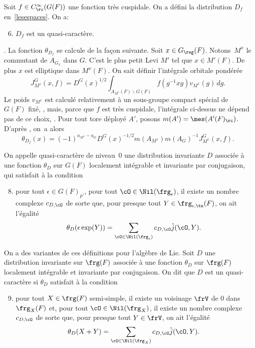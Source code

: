 Soit $f\in C_{\rc}^{\infty}(G(F))$ une fonction très cuspidale. On a défini la distribution $D_{f}$ en~\ref{lesespaces}. On a:
\begin{enumerate}\setcounter{enumi}{5}
\item\label{quasicaracteres6}
$D_{f}$ est un quasi-caractère.
\end{enumerate}
\Cf \cite[5.9]{W1}. La fonction $\theta_{D_{f}}$ se calcule de la façon suivante. Soit $x\in G_{\reg}(F)$. Notons~$M^x$ le commutant de $A_{G_{x}}$ dans $G$. C'est le plus petit Levi $M'$ tel que $x\in M'(F)$. De plus $x$ est elliptique dans $M^{x}(F)$. On sait définir l'intégrale orbitale pondérée
\[
J^G_{M^{x}}(x,f)=D^G(x)^{1/2}\int_{A_{M^{x}}(F)\backslash G(F)}f(g^{-1}xg)v_{M^{x}}(g)\,dg.
\]
Le poids $v_{M^{x}}$ est calculé relativement à un sous-groupe compact spécial de $G(F)$ fixé, \cf \cite{A1}, mais, parce que $f$ est très cuspidale, l'intégrale ci-dessus ne dépend pas de ce choix, \cf \cite[Lem.\,5.2]{W1}. Pour tout tore déployé $A'$, posons $m(A')=\mes(A'(F)_{\rc})$. D'après \cite[9(1)]{W2}, on~a alors
\begin{equation}\tag{7}\label{quasicaracteres7}
\theta_{D_{f}}(x)=(-1)^{a_{M^{x}}-a_{G}}D^G(x)^{-1/2}m(A_{M^{x}})m(A_{G})^{-1}J^G_{M^{x}}(x,f).
\end{equation}

On appelle quasi-caractère de niveau~$0$ une distribution invariante $D$ associée à une fonction $\theta_{D}$ sur $G(F)$ localement intégrable et invariante par conjugaison, qui satisfait à la condition
\begin{enumerate}\setcounter{enumi}{7}
\item\label{quasicaracteres8}
pour tout $\epsilon\in G(F)_{p'}$, pour tout $\cO\in \Nil(\frg_{\epsilon})$, il existe un nombre complexe $c_{D,\cO}$ de sorte que, pour presque tout $Y\in \frg_{\epsilon,\tn}(F)$, on ait l'égalité
\[
\theta_{D}(\epsilon \exp(Y))=\sum_{\cO\in \Nil(\frg_{\epsilon})}c_{D,\cO}\hat{j}(\cO,Y).
\]
\end{enumerate}

On a des variantes de ces définitions pour l'algèbre de Lie. Soit $D$ une distribution invariante sur $\frg(F)$ associée à une fonction $\theta_{D}$ sur $\frg(F)$ localement intégrable et invariante par conjugaison. On dit que $D$ est un quasi-caractère si $\theta_{D}$ satisfait à la condition
\begin{enumerate}\setcounter{enumi}{8}
\item\label{quasicaracteres9}
pour tout $X\in \frg(F)$ semi-simple, il existe un voisinage $\frV$ de $0$ dans $\frg_{X}(F)$ et, pour tout $\cO\in \Nil(\frg_{X})$, il existe un nombre complexe $c_{D,\cO}$ de sorte que, pour presque tout $Y\in \frV$, on ait l'égalité
\[
\theta_{D}(X+Y)=\sum_{\cO\in \Nil(\frg_{X})}c_{D,\cO}\hat{j}(\cO,Y).
\]
\end{enumerate}

